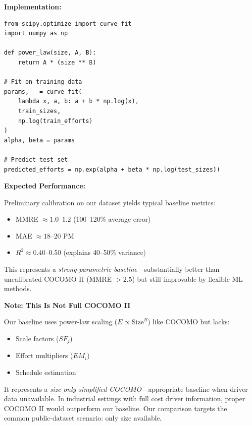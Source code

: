 \documentclass[11pt,a4paper]{article}
\begin{document}
\textbf{Implementation:}

\begin{verbatim}
from scipy.optimize import curve_fit
import numpy as np

def power_law(size, A, B):
    return A * (size ** B)

# Fit on training data
params, _ = curve_fit(
    lambda x, a, b: a + b * np.log(x), 
    train_sizes, 
    np.log(train_efforts)
)
alpha, beta = params

# Predict test set
predicted_efforts = np.exp(alpha + beta * np.log(test_sizes))
\end{verbatim}

\textbf{Expected Performance:}

Preliminary calibration on our dataset yields typical baseline metrics:
\begin{itemize}
    \item MMRE $\approx 1.0$--$1.2$ (100--120\% average error)
    \item MAE $\approx 18$--$20$ PM
    \item $R^2 \approx 0.40$--$0.50$ (explains 40--50\% variance)
\end{itemize}

This represents a \textit{strong parametric baseline}---substantially better than uncalibrated COCOMO II (MMRE $> 2.5$) but still improvable by flexible ML methods.

\textbf{Note: This Is Not Full COCOMO II}

Our baseline uses power-law scaling ($E \propto \text{Size}^B$) like COCOMO but lacks:
\begin{itemize}
    \item Scale factors ($SF_j$)
    \item Effort multipliers ($EM_i$)
    \item Schedule estimation
\end{itemize}

It represents a \textit{size-only simplified COCOMO}---appropriate baseline when driver data unavailable. In industrial settings with full cost driver information, proper COCOMO II would outperform our baseline. Our comparison targets the common public-dataset scenario: only size available.

\newpage

\end{document}
